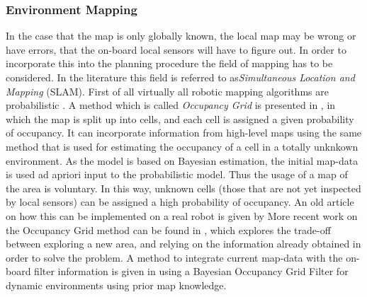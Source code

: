 \subsubsection{Environment Mapping}
In the case that the map is only globally known, the local map may be wrong or
have errors, that the on-board local sensors will have to figure out. In order
to incorporate this into the planning procedure the field of mapping has to be
considered. In the literature this field is referred to as\textit{Simultaneous
  Location and Mapping} (SLAM). First of all virtually all robotic mapping
algorithms are probabilistic \cite{thrunRoboticMappingSurvey}. %
A method which is called \textit{Occupancy Grid} is presented in
\cite{elfes1989using}, in which the map is split up into cells, and each cell is
assigned a given probability of occupancy. It can incorporate information from
high-level maps using the same method that is used for estimating the occupancy
of a cell in a totally unknkown environment. As the model is based on Bayesian
estimation, the initial map-data is used ad apriori input to the probabilistic
model. Thus the usage of a map of the area is voluntary. In this way, unknown
cells (those that are not yet inspected by local sensors) can be assigned a high
probability of occupancy. An old article on how this can be implemented on a
real robot is given by \cite[Krugman]{kriegman1987mobile} More recent work on
the Occupancy Grid method can be found in
\cite{carrilloAutonomousRoboticExploration2015}, which explores the trade-off
between exploring a new area, and relying on the information already obtained in
order to solve the problem. A method to integrate current map-data with the
on-board filter information is given in \cite{gindeleBayesianOccupancyGrid2009}
using a Bayesian Occupancy Grid Filter for dynamic environments using prior map
knowledge.
